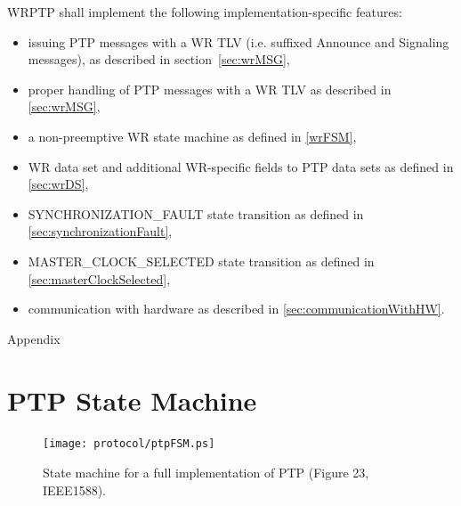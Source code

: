 \documentclass[a4paper, 12pt]{article}
\begin{document}
WRPTP shall implement the following implementation-specific features:
\begin{itemize}
  \item issuing PTP messages with a WR TLV (i.e. suffixed Announce and Signaling messages),
	as described in section~\ref{sec:wrMSG},
  \item proper handling of PTP messages with a WR TLV as described in \ref{sec:wrMSG},
  \item a non-preemptive WR state machine as defined in \ref{wrFSM},
  \item WR data set and additional WR-specific fields to PTP data sets as defined in 
	\ref{sec:wrDS},
  \item SYNCHRONIZATION\_FAULT state transition as defined in \ref{sec:synchronizationFault},
  \item MASTER\_CLOCK\_SELECTED state transition as defined in \ref{sec:masterClockSelected},
  \item communication with hardware as described in \ref{sec:communicationWithHW}.
\end{itemize}


\newpage
\begin{center}
\huge Appendix
\end{center} 

\normalsize
\appendix
\section{PTP State Machine}
\label{ptpFSM}

 \begin{figure}[ht!]
   \centering
   \texttt{[image: protocol/ptpFSM.ps]}
   \caption{State machine for a full implementation of PTP (Figure 23, IEEE1588).}
   \label{fig:ptpFSM}
 \end{figure}
 
 \newpage
\end{document}
